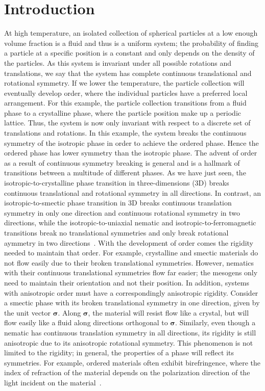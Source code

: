 \chapter{Introduction}\label{c:1}
At high temperature, an isolated collection of spherical particles at a low enough volume fraction is a fluid and thus is a uniform system; the probability of finding a particle at a specific position is a constant and only depends on the density of the particles.
As this system is invariant under all possible rotations and translations, we say that the system has complete continuous translational and rotational symmetry.
If we lower the temperature, the particle collection will eventually develop order, where the individual particles have a preferred local arrangement.
For this example, the particle collection transitions from a fluid phase to a crystalline phase, where the particle position make up a periodic lattice.
Thus, the system is now only invariant with respect to a discrete set of translations and rotations.
In this example, the system breaks the continuous symmetry of the isotropic phase in order to achieve the ordered phase.
Hence the ordered phase has lower symmetry than the isotropic phase.
The advent of order as a result of continuous symmetry breaking is general and is a hallmark of transitions between a multitude of different phases.
As we have just seen, the isotropic-to-crystalline phase transition in three-dimensions (3D) breaks continuous translational and rotational symmetry in all directions.
In contrast, an isotropic-to-smectic phase transition in 3D breaks continuous translation symmetry in only one direction and continuous rotational symmetry in two directions, while the isotropic-to-uniaxial nematic and isotropic-to-ferromagnetic transitions break no translational symmetries and only break rotational aymmetry in two directions~\cite{RN175}.
With the development of order comes the rigidity needed to maintain that order.
For example, crystalline and smectic materials do not flow easily due to their broken translational symmetries.
However, nematics with their continuous translational symmetries flow far easier; the mesogens only need to maintain their orientation and not their position.
In addition, systems with anisotropic order must have a correspondingly anisotropic rigidity.
Consider a smectic phase with its broken translational symmetry in one direction, given by the unit vector $\bm{\sigma}$.
Along $\bm{\sigma}$, the material will resist flow like a crystal, but will flow easily like a fluid along directions orthogonal to $\bm{\sigma}$.
Similarly, even though a nematic has continuous translation symmetry in all directions, its rigidity is still anisotropic due to its anisotropic rotational symmetry.
This phenomenon is not limited to the rigidity; in general, the properties of a phase will reflect its symmetries.
For example, ordered materials often exhibit birefringence, where the index of refraction of the material depends on the polarization direction of the light incident on the material~\cite{RN175}.

